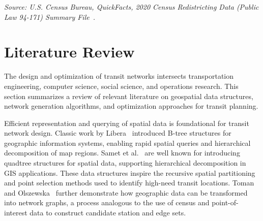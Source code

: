 \documentclass[sigconf,nonacm]{acmart}
\begin{document}
\noindent\textit{Source: U.S. Census Bureau, QuickFacts, 2020 Census Redistricting Data (Public Law 94-171) Summary File~\cite{lit:census}.} 


\begin{table}[h]
\caption{Key Data Sources Used in the Study}
\label{tab:datasources}
\end{table}

\section{Literature Review}

The design and optimization of transit networks intersects transportation engineering, computer science, social science, and operations research. This section summarizes a review of relevant literature on geospatial data structures, network generation algorithms, and optimization approaches for transit planning.

Efficient representation and querying of spatial data is foundational for transit network design. Classic work by Libera~\cite{bib:libera1986btrees} introduced B-tree structures for geographic information systems, enabling rapid spatial queries and hierarchical decomposition of map regions. Samet et al.~\cite{bib:samet1984quadtrees} are well known for introducing quadtree structures for spatial data, supporting hierarchical decomposition in GIS applications. These data structures inspire the recursive spatial partitioning and point selection methods used to identify high-need transit locations. Toman and Olszewska~\cite{toman2014algorithm} further demonstrate how geographic data can be transformed into network graphs, a process analogous to the use of census and point-of-interest data to construct candidate station and edge sets.
\end{document}
